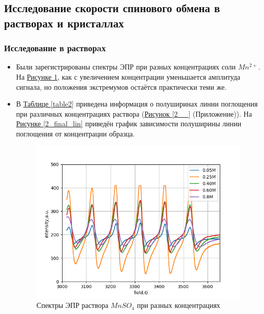 \documentclass{article}
\begin{document}
\subsection{Исследование скорости спинового обмена в растворах и кристаллах}


\subsubsection{Исследование в растворaх}
 \begin{itemize}
 \item Были зарегистрированы спектры ЭПР при разных концентрациях соли $Mn^{2+}$. На \hyperref[2_all]{Рисунке \ref*{2_all}}, как с увеличением концентрации уменьшается амплитуда сигнала, но положения экстремумов остаётся практически теми же.

\item В \hyperref[table2]{Таблице \ref*{table2}} приведена информация о полуширинах линии поглощения при различных концентрациях раствора (\hyperref[2__]{Рисунок \ref*{2__}} (Приложение)). На \hyperref[2_final_lin]{Рисунке \ref*{2_final_lin}} приведён график зависимости полуширины линии поглощения от концентрации образца. 


\begin{figure}[h!]
        \centering
        \includegraphics[scale = 0.8]{2.1/2_all.png}
        \caption{Спектры ЭПР раствора $MnSO_4$ при разных концентрациях}
        \label{2_all}
    \end{figure}


\end{itemize}
\end{document}
